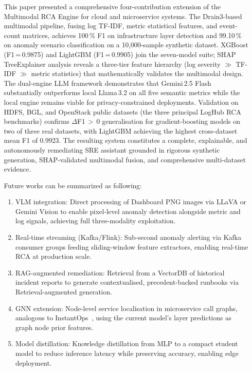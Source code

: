 \documentclass[5p, times]{elsarticle}
\begin{document}
This paper presented a comprehensive four-contribution extension of the Multimodal RCA Engine for cloud and microservice systems. The Drain3-based multimodal pipeline, fusing log TF-IDF, metric
statistical features, and event-count matrices, achieves 100\,\% F1 on infrastructure layer detection and 99.10\,\% on anomaly scenario classification on a 10{,}000-sample synthetic dataset. XGBoost (F1\,=\,0.9875) and LightGBM (F1\,=\,0.9905) join the seven-model suite; SHAP TreeExplainer analysis reveals a three-tier feature hierarchy (log severity $\gg$ TF-IDF $\gg$
metric statistics) that mathematically validates the multimodal design. The dual-engine LLM framework demonstrates that Gemini\,2.5 Flash substantially outperforms local Llama\,3.2 on all five semantic metrics while the local engine remains viable
for privacy-constrained deployments. Validation on HDFS, BGL, and OpenStack public datasets (the three principal LogHub RCA benchmarks) confirms $\Delta$F1\,$>$\,0 generalisation for gradient-boosting models on two of three real datasets, with
LightGBM achieving the highest cross-dataset mean F1 of 0.9923. The resulting system constitutes a complete, explainable, and autonomously remediating SRE assistant grounded in rigorous synthetic generation, SHAP-validated multimodal fusion, and
comprehensive multi-dataset evidence.

Future works can be summarized as following:

\begin{enumerate}[leftmargin=*, topsep=2pt, itemsep=1pt]
    \item VLM integration: Direct processing of Dashboard PNG images via LLaVA or Gemini Vision to enable pixel-level anomaly detection alongside metric and log signals, achieving
    full three-modality exploitation.
    \item Real-time streaming (Kafka/Flink): Sub-second anomaly alerting via Kafka consumer groups feeding sliding-window feature extractors, enabling real-time RCA at production scale.
    \item RAG-augmented remediation: Retrieval from a
    VectorDB of historical incident reports to generate contextualised, precedent-backed runbooks via Retrieval-augmented generation.
    \item GNN extension: Node-level service localisation in microservice call graphs, analogous to InstantOps~\cite{instantops2024}, using the current model's layer predictions as graph node prior features.
    \item Model distillation: Knowledge distillation from MLP to a compact student model to reduce inference latency while preserving accuracy, enabling edge deployment.
\end{enumerate}
\end{document}

